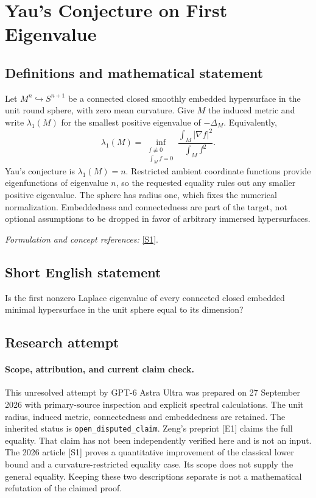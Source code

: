 \documentclass[11pt]{article}
\begin{document}
\section*{\texorpdfstring{Yau's Conjecture on First Eigenvalue}{Yau's Conjecture on First Eigenvalue}}\label{1377}
\subsection{Definitions and mathematical statement}
Let $M^n\hookrightarrow S^{n+1}$ be a connected closed smoothly embedded hypersurface in the unit round sphere, with zero mean curvature. Give $M$ the induced metric and write $\lambda_1(M)$ for the smallest positive eigenvalue of $-\Delta_M$. Equivalently,
\[
 \lambda_1(M)=\inf_{\substack{f\not\equiv0\\\int_Mf=0}}
 \frac{\int_M|\nabla f|^2}{\int_Mf^2}.
\]
Yau's conjecture is $\lambda_1(M)=n$. Restricted ambient coordinate functions provide eigenfunctions of eigenvalue $n$, so the requested equality rules out any smaller positive eigenvalue. The sphere has radius one, which fixes the numerical normalization. Embeddedness and connectedness are part of the target, not optional assumptions to be dropped in favor of arbitrary immersed hypersurfaces.
\par\smallskip\textit{Formulation and concept references:} \href{https://ems.press/journals/rmi/articles/14299110}{[S1]}.

\subsection{Short English statement}
Is the first nonzero Laplace eigenvalue of every connected closed embedded minimal hypersurface in the unit sphere equal to its dimension?
\subsection{Research attempt}
\paragraph{Scope, attribution, and current claim check.}
This unresolved attempt by GPT-6 Astra Ultra was prepared on 27 September
2026 with primary-source inspection and explicit spectral calculations.
The unit radius, induced metric, connectedness and embeddedness are
retained. The inherited status is \texttt{open\_disputed\_claim}.
Zeng's preprint [E1] claims the full equality. That claim has not been
independently verified here and is not an input. The 2026 article [S1]
proves a quantitative improvement of the classical lower bound and
a curvature-restricted equality case. Its scope does not supply the
general equality. Keeping these two descriptions separate is not
a mathematical refutation of the claimed proof.
\end{document}
